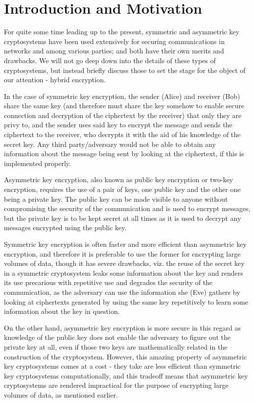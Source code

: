 \section{Introduction and Motivation}
For quite some time leading up to the present, symmetric and asymmetric key cryptosystems have been used extensively for securing communications in networks and among various parties; and both have their own merits and drawbacks. We will not go deep down into the details of these types of cryptosystems, but instead briefly discuss those to set the stage for the object of our attention - hybrid encryption.

In the case of symmetric key encryption, the sender (Alice) and receiver (Bob) share the same key (and therefore must share the key somehow to enable secure connection and decryption of the ciphertext by the receiver) that only they are privy to, and the sender uses said key to encrypt the message and sends the ciphertext to the receiver, who decrypts it with the aid of his knowledge of the secret key. Any third party/adversary would not be able to obtain any information about the message being sent by looking at the ciphertext, if this is implemented properly.\cite{smirnoff_turner_2019}

Asymmetric key encryption, also known as public key encryption or two-key encryption\cite{kaliski_acry}, requires the use of a pair of keys, one public key and the other one being a private key. The public key can be made visible to anyone without compromising the security of the communication and is used to encrypt messages, but the private key is to be kept secret at all times as it is used to decrypt any messages encrypted using the public key.\cite{savvyasym}

Symmetric key encryption is often faster and more efficient than asymmetric key encryption, and therefore it is preferable to use the former for encrypting large volumes of data, though it has severe drawbacks, viz. the reuse of the secret key in a symmetric cryptosystem leaks some information about the key and renders its use precarious with repetitive use and degrades the security of the communication, as the adversary can use the information she (Eve) gathers by looking at ciphertexts generated by using the same key repetitively to learn some information about the key in question.\cite{smirnoff_turner_2019}

On the other hand, asymmetric key encryption is more secure in this regard as knowledge of the public key does not enable the adversary to figure out the private key at all, even if those two keys are mathematically related in the construction of the cryptosystem. However, this amazing property of asymmetric key cryptosystems comes at a cost - they take are less efficient than symmetric key cryptosystems computationally, and this tradeoff means that asymmetric key cryptosystems are rendered impractical for the purpose of encrypting large volumes of data, as mentioned earlier.

